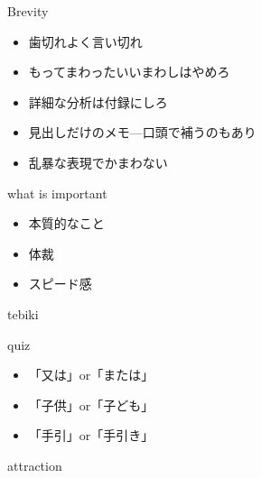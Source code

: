\documentclass[
  ignorenonframetext,
]{beamer}
\providecommand{\tightlist}{%
  \setlength{\itemsep}{0pt}\setlength{\parskip}{0pt}}
\begin{document}
\begin{frame}{Brevity}
\protect\hypertarget{brevity-7}{}
\Large

\begin{itemize}
 \item[\textbullet] 歯切れよく言い切れ
 \item[\textbullet] もってまわったいいまわしはやめろ
 \item[\textbullet] 詳細な分析は付録にしろ
 \item[\textbullet] 見出しだけのメモ---口頭で補うのもあり
 \item[\textbullet] 乱暴な表現でかまわない
\end{itemize}
\end{frame}

\begin{frame}{what is important}
\protect\hypertarget{what-is-important}{}
\Huge

\begin{itemize}[<+->]
\tightlist
\item
  \textbullet{}\hspace{2pt}本質的なこと \bigskip
\item
  \textbullet{}\hspace{2pt}体裁 \bigskip
\item
  \textbullet{}\hspace{2pt}スピード感
\end{itemize}
\end{frame}

\begin{frame}{tebiki}
\protect\hypertarget{tebiki-1}{}
\vspace*{-20pt}
\end{frame}

\begin{frame}{quiz}
\protect\hypertarget{quiz}{}
\Huge

\begin{itemize}[<+->]
\tightlist
\item
  「又は」or「または」 \bigskip
\item
  「子供」or「子ども」 \bigskip
\item
  「手引」or「手引き」
\end{itemize}
\end{frame}

\begin{frame}{attraction}
\protect\hypertarget{attraction}{}
\vspace*{-4pt}
\end{frame}
\end{document}
